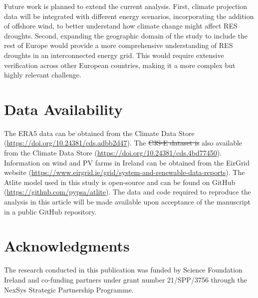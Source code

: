 \documentclass[preprint, 12pt]{elsarticle}
\providecommand{\DIFadd}[1]{{\protect\color{blue}\uwave{#1}}} %
\providecommand{\DIFdel}[1]{{\protect\color{red}\sout{#1}}}                      %
\providecommand{\DIFaddbegin}{} %
\providecommand{\DIFaddend}{} %
\providecommand{\DIFdelbegin}{} %
\providecommand{\DIFdelend}{} %
\begin{document}
Future work is planned to extend the current analysis. First, climate projection data will be integrated with different energy scenarios, incorporating the addition of offshore wind, to better understand how climate change might affect RES droughts. Second, expanding the geographic domain of the study to include the rest of Europe would provide a more comprehensive understanding of RES droughts in an interconnected energy grid. This would require extensive verification across other European countries, making it a more complex but highly relevant challenge.

\section*{Data Availability}

The ERA5 data can be obtained from the Climate Data Store (\url{https://doi.org/10.24381/cds.adbb2d47}). The \DIFdelbegin \DIFdel{C3S-E dataset is }\DIFdelend \DIFaddbegin \DIFadd{C3S datasets are }\DIFaddend also available from the Climate Data Store (\url{https://doi.org/10.24381/cds.4bd77450}). Information on wind and \DIFaddbegin \DIFadd{solar }\DIFaddend PV farms in Ireland can be obtained from the EirGrid website (\url{https://www.eirgrid.ie/grid/system-and-renewable-data-reports}). The Atlite model used in this study is open-source and can be found on GitHub (\url{https://github.com/pypsa/atlite}). The data and code required to reproduce the analysis in this article will be made available upon acceptance of the manuscript in a public GitHub repository.

\section*{Acknowledgments}

The research conducted in this publication was funded by Science Foundation Ireland and co-funding partners under grant number 21/SPP/3756 through the NexSys Strategic Partnership Programme.



\end{document}
